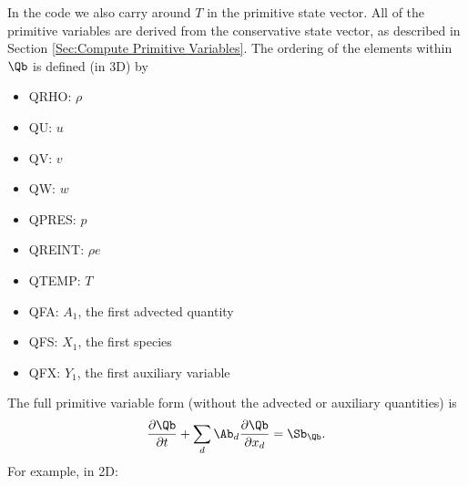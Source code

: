 In the code we also carry around $T$ in the primitive state vector.
All of the primitive variables are derived from the conservative state
vector, as described in Section \ref{Sec:Compute Primitive Variables}.
The ordering of the elements within $\Qb$ is defined (in 3D) by
\begin{itemize}
\item QRHO: $\rho$
\item QU: $u$
\item QV: $v$
\item QW: $w$
\item QPRES: $p$
\item QREINT: $\rho e$
\item QTEMP: $T$
\item QFA: $A_1$, the first advected quantity
\item QFS: $X_1$, the first species
\item QFX: $Y_1$, the first auxiliary variable
\end{itemize}
The full primitive variable form (without the advected or auxiliary quantities) is
\begin{equation}
\frac{\partial\Qb}{\partial t} + \sum_d \Ab_d\frac{\partial\Qb}{\partial x_d} = \Sb_{\Qb}.
\end{equation}
For example, in 2D:
